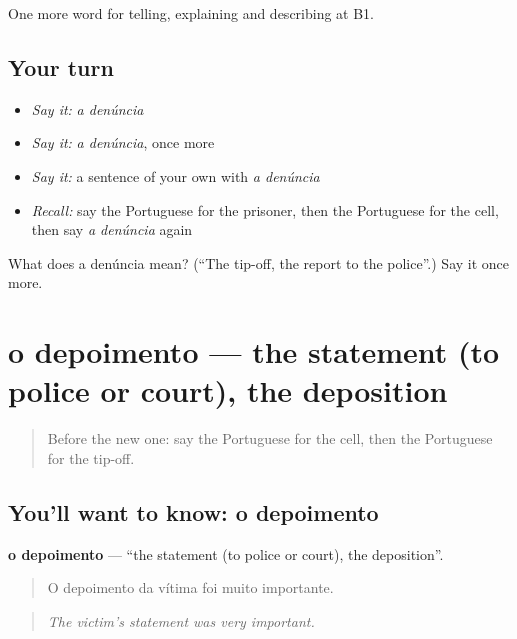\begin{grammarlens}[title={What you've built}]
One more word for telling, explaining and describing at B1.
\end{grammarlens}

\subsection*{Your turn}
\begin{itemize}
\raggedright
  \item \emph{Say it:} \emph{a denúncia}
  \item \emph{Say it:} \emph{a denúncia}, once more
  \item \emph{Say it:} a sentence of your own with \emph{a denúncia}
  \item \emph{Recall:} say the Portuguese for the prisoner, then the Portuguese for the cell, then say \emph{a denúncia} again
\end{itemize}

\begin{tcolorbox}[breakable,colback=teal!4,colframe=teal!35!black,title={Before you move on}]
What does a denúncia mean? (\textquotedblleft{}The tip-off, the report to the police\textquotedblright{}.) Say it once more.
\end{tcolorbox}
\section[o depoimento]{o depoimento — the statement (to police or court), the deposition}

\label{lesson:PT-C297-depoimento}



\begin{quote}
Before the new one: say the Portuguese for the cell, then the Portuguese for the tip-off.
\end{quote}

\subsection*{You'll want to know: o depoimento}
\textbf{o depoimento} — \textquotedblleft{}the statement (to police or court), the deposition\textquotedblright{}.

\begin{quote}
O depoimento da vítima foi muito importante.
\end{quote}

\begin{quote}
\emph{The victim’s statement was very important.}
\end{quote}

